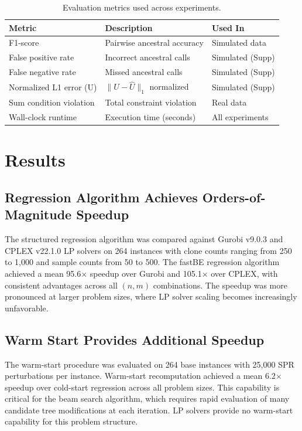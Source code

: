 \documentclass[11pt]{article}
\begin{document}
\begin{table}[htbp]
\centering
\caption{Evaluation metrics used across experiments.}
\label{tab:metrics}
\begin{tabular}{lll}
\toprule
Metric & Description & Used In \\
\midrule
F1-score & Pairwise ancestral accuracy & Simulated data \\
False positive rate & Incorrect ancestral calls & Simulated (Supp) \\
False negative rate & Missed ancestral calls & Simulated (Supp) \\
Normalized L1 error (U) & $\|U - \hat{U}\|_1$ normalized & Simulated (Supp) \\
Sum condition violation & Total constraint violation & Real data \\
Wall-clock runtime & Execution time (seconds) & All experiments \\
\bottomrule
\end{tabular}
\end{table}

\section{Results}

\subsection{Regression Algorithm Achieves Orders-of-Magnitude Speedup}

The structured regression algorithm was compared against Gurobi v9.0.3 and CPLEX v22.1.0 LP solvers on 264 instances with clone counts ranging from 250 to 1,000 and sample counts from 50 to 500. The fastBE regression algorithm achieved a mean 95.6$\times$ speedup over Gurobi and 105.1$\times$ over CPLEX, with consistent advantages across all $(n, m)$ combinations. The speedup was more pronounced at larger problem sizes, where LP solver scaling becomes increasingly unfavorable.

\subsection{Warm Start Provides Additional Speedup}

The warm-start procedure was evaluated on 264 base instances with 25,000 SPR perturbations per instance. Warm-start recomputation achieved a mean 6.2$\times$ speedup over cold-start regression across all problem sizes. This capability is critical for the beam search algorithm, which requires rapid evaluation of many candidate tree modifications at each iteration. LP solvers provide no warm-start capability for this problem structure.
\end{document}
